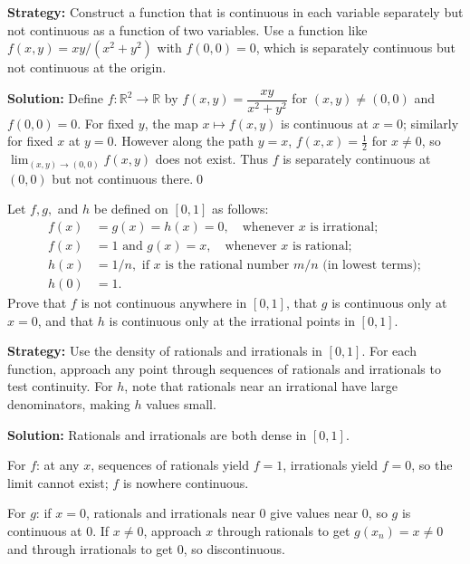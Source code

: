 \noindent\textbf{Strategy:} Construct a function that is continuous in each variable separately but not continuous as a function of two variables. Use a function like $f(x,y) = xy/(x^2+y^2)$ with $f(0,0) = 0$, which is separately continuous but not continuous at the origin.

\bigskip\noindent\textbf{Solution:}
Define $f:\mathbb{R}^2\to\mathbb{R}$ by $f(x,y)=\dfrac{xy}{x^2+y^2}$ for $(x,y)\ne(0,0)$ and $f(0,0)=0$. For fixed $y$, the map $x\mapsto f(x,y)$ is continuous at $x=0$; similarly for fixed $x$ at $y=0$. However along the path $y=x$, $f(x,x)=\tfrac{1}{2}$ for $x\ne0$, so $\lim_{(x,y)\to(0,0)}f(x,y)$ does not exist. Thus $f$ is separately continuous at $(0,0)$ but not continuous there.\qed



\begin{problembox}
Let \( f, g, \) and \( h \) be defined on \([0, 1]\) as follows:
\begin{align*}
f(x) &= g(x) = h(x) = 0, \quad \text{whenever } x \text{ is irrational}; \\
f(x) &= 1 \text{ and } g(x) = x, \quad \text{whenever } x \text{ is rational}; \\
h(x) &= 1/n, \text{ if } x \text{ is the rational number } m/n \text{ (in lowest terms)}; \\
h(0) &= 1.
\end{align*}
Prove that \( f \) is not continuous anywhere in \([0, 1]\), that \( g \) is continuous only at \( x = 0 \), and that \( h \) is continuous only at the irrational points in \([0, 1]\).
\end{problembox}

\noindent\textbf{Strategy:} Use the density of rationals and irrationals in $[0,1]$. For each function, approach any point through sequences of rationals and irrationals to test continuity. For $h$, note that rationals near an irrational have large denominators, making $h$ values small.

\bigskip\noindent\textbf{Solution:}
Rationals and irrationals are both dense in $[0,1]$.

For $f$: at any $x$, sequences of rationals yield $f=1$, irrationals yield $f=0$, so the limit cannot exist; $f$ is nowhere continuous.

For $g$: if $x=0$, rationals and irrationals near $0$ give values near $0$, so $g$ is continuous at $0$. If $x\ne0$, approach $x$ through rationals to get $g(x_n)=x\ne 0$ and through irrationals to get $0$, so discontinuous.

